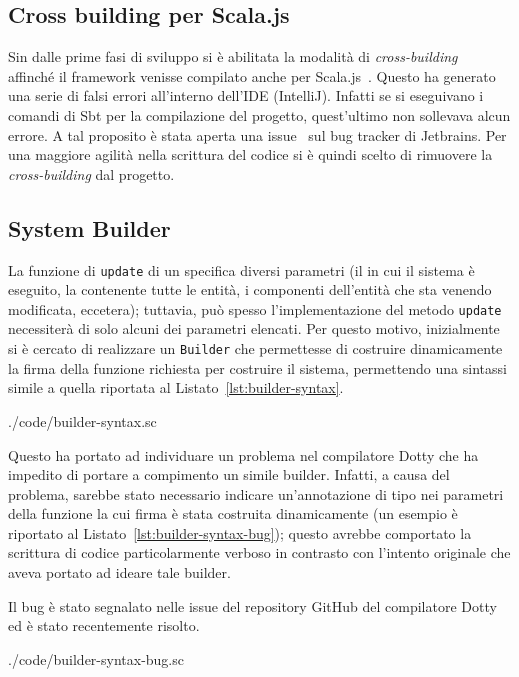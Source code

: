 \subsection{Cross building per Scala.js}
Sin dalle prime fasi di sviluppo si è abilitata la modalità di \textit{cross-building}~\cite{cross-building} affinché il
framework venisse compilato anche per Scala.js~\cite{scalajs}.
Questo ha generato una serie di falsi errori all'interno dell'IDE (IntelliJ).
Infatti se si eseguivano i comandi di Sbt per la compilazione del progetto, quest'ultimo non sollevava alcun errore.
A tal proposito è stata aperta una issue~\cite{intellij-issue} sul bug tracker di Jetbrains.
Per una maggiore agilità nella scrittura del codice si è quindi scelto di rimuovere la \textit{cross-building} dal
progetto.

\subsection{System Builder}
La funzione di \texttt{update} di un \System specifica diversi parametri (il \World in cui il sistema è eseguito,
la \View contenente tutte le entità, i componenti dell'entità che sta venendo modificata, eccetera); tuttavia, può
spesso l'implementazione del metodo \texttt{update} necessiterà di solo alcuni dei parametri elencati.
Per questo motivo, inizialmente si è cercato di realizzare un \texttt{Builder} che permettesse di costruire
dinamicamente la firma della funzione richiesta per costruire il sistema, permettendo una sintassi simile a quella
riportata al Listato~\ref{lst:builder-syntax}.


{./code/builder-syntax.sc}

Questo ha portato ad individuare un problema nel compilatore Dotty che ha impedito di portare a compimento un simile
builder.
Infatti, a causa del problema, sarebbe stato necessario indicare un'annotazione di tipo nei parametri della
funzione la cui firma è stata costruita dinamicamente (un esempio è riportato al Listato~\ref{lst:builder-syntax-bug});
questo avrebbe comportato la scrittura di codice particolarmente verboso in contrasto con l'intento originale che aveva
portato ad ideare tale builder.

Il bug\cite{dotty-bug} è stato segnalato nelle issue del repository GitHub del compilatore Dotty
ed è stato recentemente risolto.


{./code/builder-syntax-bug.sc}


